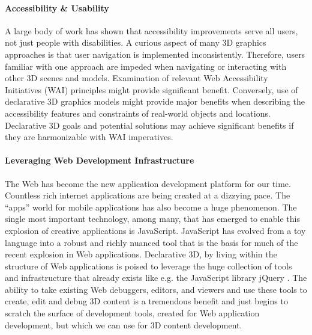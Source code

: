 \documentclass[review]{acmsiggraph}
\begin{document}
\paragraph{Accessibility \& Usability}
A large body of work has shown that accessibility improvements serve all users, not just people with disabilities.  A curious aspect of many 3D graphics approaches is that user navigation is implemented inconsistently.  Therefore, users familiar with one approach are impeded when navigating or interacting with other 3D scenes and models.  Examination of relevant Web Accessibility Initiatives (WAI) principles might provide significant benefit.  Conversely, use of declarative 3D graphics models might provide major benefits when describing the accessibility features and constraints of real-world objects and locations.  Declarative 3D goals and potential solutions may achieve significant benefits if they are harmonizable with WAI imperatives.

\paragraph{Leveraging Web Development Infrastructure}
The Web has become the new application development platform for our time. Countless rich internet applications are being created at a dizzying pace. The ``apps'' world for mobile applications has also become a huge phenomenon. The single most important technology, among many, that has emerged to enable this explosion of creative applications is JavaScript. JavaScript has evolved from a toy language into a robust and richly nuanced tool that is the basis for much of the recent explosion in Web applications.
Declarative 3D, by living within the structure of Web applications is poised to leverage the huge collection of tools and infrastructure that already exists like e.g. the JavaScript library jQuery \cite{jquery}. The ability to take existing Web debuggers, editors, and viewers and use these tools to create, edit and debug 3D content is a tremendous benefit and just begins to scratch the surface of development tools, created for Web application development, but which we can use for 3D content development.
\end{document}
